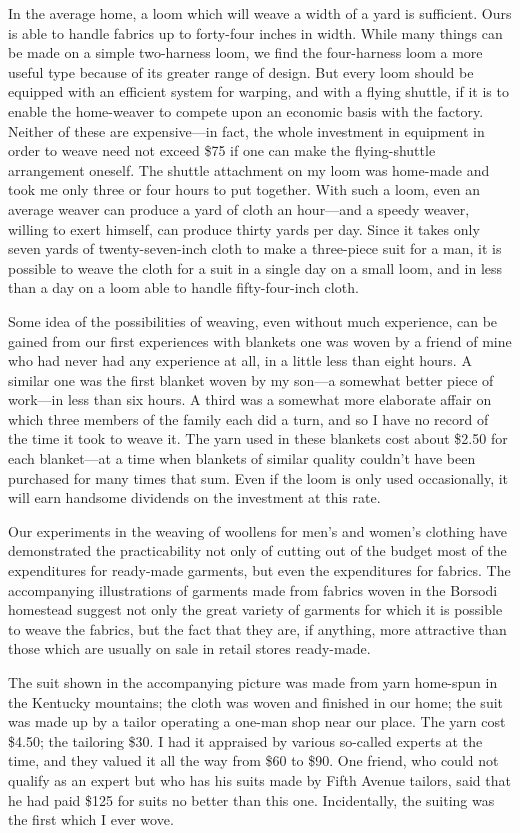\documentclass{book}
\begin{document}
In the average home, a loom which will weave a width of a yard is sufficient. Ours is able to handle fabrics up to forty-four inches in width. While many things can be made on a simple two-harness loom, we find the four-harness loom a more useful type because of its greater range of design. But every loom should be equipped with an efficient system for warping, and with a flying shuttle, if it is to enable the home-weaver to compete upon an economic basis with the factory. Neither of these are expensive—in fact, the whole investment in equipment in order to weave need not exceed \$75 if one can make the flying-shuttle arrangement oneself. The shuttle attachment on my loom was home-made and took me only three or four hours to put together. With such a loom, even an average weaver can produce a yard of cloth an hour—and a speedy weaver, willing to exert himself, can produce thirty yards per day. Since it takes only seven yards of twenty-seven-inch cloth to make a three-piece suit for a man, it is possible to weave the cloth for a suit in a single day on a small loom, and in less than a day on a loom able to handle fifty-four-inch cloth.

Some idea of the possibilities of weaving, even without much experience, can be gained from our first experiences with blankets one was woven by a friend of mine who had never had any experience at all, in a little less than eight hours. A similar one was the first blanket woven by my son—a somewhat better piece of work—in less than six hours. A third was a somewhat more elaborate affair on which three members of the family each did a turn, and so I have no record of the time it took to weave it. The yarn used in these blankets cost about \$2.50 for each blanket—at a time when blankets of similar quality couldn’t have been purchased for many times that sum. Even if the loom is only used occasionally, it will earn handsome dividends on the investment at this rate.

Our experiments in the weaving of woollens for men’s and women’s clothing have demonstrated the practicability not only of cutting out of the budget most of the expenditures for ready-made garments, but even the expenditures for fabrics. The accompanying illustrations of garments made from fabrics woven in the Borsodi homestead suggest not only the great variety of garments for which it is possible to weave the fabrics, but the fact that they are, if anything, more attractive than those which are usually on sale in retail stores ready-made.

The suit shown in the accompanying picture was made from yarn home-spun in the Kentucky mountains; the cloth was woven and finished in our home; the suit was made up by a tailor operating a one-man shop near our place. The yarn cost \$4.50; the tailoring \$30. I had it appraised by various so-called experts at the time, and they valued it all the way from \$60 to \$90. One friend, who could not qualify as an expert but who has his suits made by Fifth Avenue tailors, said that he had paid \$125 for suits no better than this one. Incidentally, the suiting was the first which I ever wove.
\end{document}
